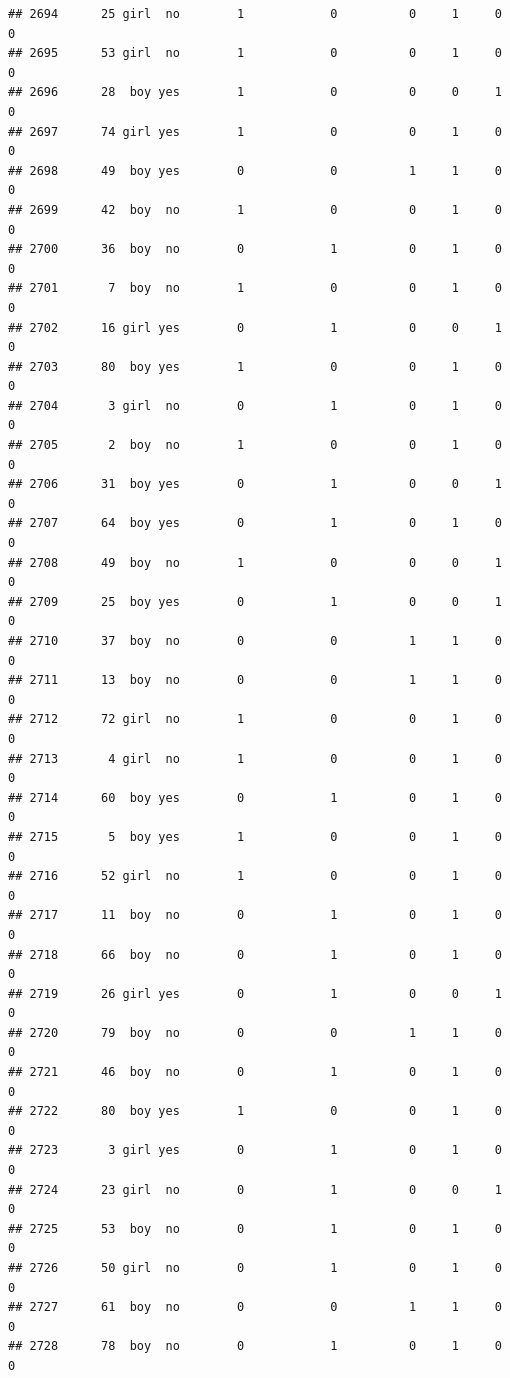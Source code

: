 \documentclass[man]{apa6}
\begin{document}
\begin{verbatim}
## 2694      25 girl  no        1            0          0     1     0     0
## 2695      53 girl  no        1            0          0     1     0     0
## 2696      28  boy yes        1            0          0     0     1     0
## 2697      74 girl yes        1            0          0     1     0     0
## 2698      49  boy yes        0            0          1     1     0     0
## 2699      42  boy  no        1            0          0     1     0     0
## 2700      36  boy  no        0            1          0     1     0     0
## 2701       7  boy  no        1            0          0     1     0     0
## 2702      16 girl yes        0            1          0     0     1     0
## 2703      80  boy yes        1            0          0     1     0     0
## 2704       3 girl  no        0            1          0     1     0     0
## 2705       2  boy  no        1            0          0     1     0     0
## 2706      31  boy yes        0            1          0     0     1     0
## 2707      64  boy yes        0            1          0     1     0     0
## 2708      49  boy  no        1            0          0     0     1     0
## 2709      25  boy yes        0            1          0     0     1     0
## 2710      37  boy  no        0            0          1     1     0     0
## 2711      13  boy  no        0            0          1     1     0     0
## 2712      72 girl  no        1            0          0     1     0     0
## 2713       4 girl  no        1            0          0     1     0     0
## 2714      60  boy yes        0            1          0     1     0     0
## 2715       5  boy yes        1            0          0     1     0     0
## 2716      52 girl  no        1            0          0     1     0     0
## 2717      11  boy  no        0            1          0     1     0     0
## 2718      66  boy  no        0            1          0     1     0     0
## 2719      26 girl yes        0            1          0     0     1     0
## 2720      79  boy  no        0            0          1     1     0     0
## 2721      46  boy  no        0            1          0     1     0     0
## 2722      80  boy yes        1            0          0     1     0     0
## 2723       3 girl yes        0            1          0     1     0     0
## 2724      23 girl  no        0            1          0     0     1     0
## 2725      53  boy  no        0            1          0     1     0     0
## 2726      50 girl  no        0            1          0     1     0     0
## 2727      61  boy  no        0            0          1     1     0     0
## 2728      78  boy  no        0            1          0     1     0     0

\end{verbatim}
\end{document}

